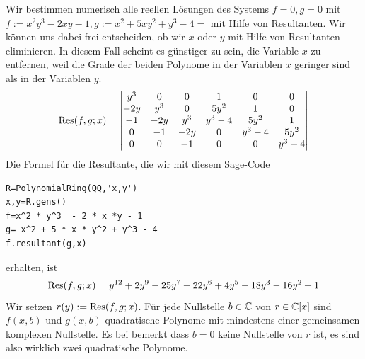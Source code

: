 \documentclass[11pt]{article}
\numberwithin{equation}{section}
\begin{document}
\begin{beispiel} 
	Wir bestimmen numerisch alle reellen Lösungen des Systems $f = 0, g= 0$ mit 
	$ f := x^2 y^3 - 2 x y -  1 , g:= x^2 + 5 xy^2 + y^3 - 4 =$ mit Hilfe von Resultanten. Wir können uns dabei frei entscheiden, ob wir $x$ oder $y$ mit Hilfe von Resultanten eliminieren. In diesem Fall scheint es günstiger zu sein, die Variable $x$ zu entfernen, weil die Grade der beiden Polynome in der Variablen $x$ geringer sind als in der Variablen $y$. 
	\[
		\operatorname{Res}(f,g;x) = \begin{vmatrix}
			 y^3 & 0 & 0 & 1 & 0 & 0 
		\\ -2 y & y^3 & 0 & 5 y^2  & 1 & 0 
		\\ -1 & -2 y  & y^3  & y^3 - 4 & 5 y^2 & 1 
	\\ 0 & -1 & -2 y & 0 & y^3 - 4 & 5 y^2 
	\\ 0 & 0 & -1 & 0 & 0 & y^3 - 4
\end{vmatrix}
	\] 
	Die Formel für die  Resultante, die wir mit diesem Sage-Code
\begin{lstlisting}
R=PolynomialRing(QQ,'x,y')
x,y=R.gens()
f=x^2 * y^3  - 2 * x *y - 1
g= x^2 + 5 * x * y^2 + y^3 - 4
f.resultant(g,x)
\end{lstlisting}  
erhalten, ist 
	\[
		\operatorname{Res}(f,g;x) = y^{12} + 2 y^{9} - 25 y^{7} - 22 y^{6} + 4 y^{5} - 18 y^{3} - 16 y^{2} + 1
	\]
	Wir setzen $r(y) := \operatorname{Res}(f,g;x)$. Für jede Nullstelle $b \in \mathbb{C}$ von $r \in \mathbb{C}[x]$ sind $f(x,b)$ und $g(x,b)$ quadratische Polynome mit mindestens einer gemeinsamen komplexen Nullstelle. Es bei bemerkt dass $b=0$ keine Nullstelle von $r$ ist, es sind also wirklich zwei quadratische Polynome. 


\end{beispiel}
\end{document}
